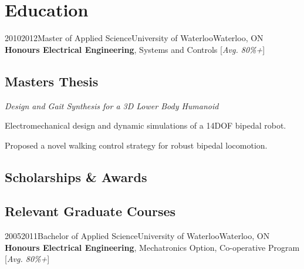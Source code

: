 \section{Education}

\vspace{2 mm}
\tlcventry
{2010}{2012}{Master of Applied Science}{University of Waterloo}{Waterloo, ON}{}
{\textbf{Honours Electrical Engineering}, Systems and Controls [\emph{Avg. 80\%+}]}

\subsection{Masters Thesis} %
	{\emph{Design and Gait Synthesis for a 3D Lower Body Humanoid}
	\begin{tightitemize}
		\item Electromechanical design and dynamic simulations of a 14DOF bipedal robot.
		\item Proposed a novel walking control strategy for robust bipedal locomotion.
	\end{tightitemize}}
	\vspace{-6 mm}
\subsection{Scholarships \& Awards} %
\subsection{Relevant Graduate Courses} %

\vspace{5 mm}
\tlcventry
{2005}{2011}{Bachelor of Applied Science}{University of Waterloo}{Waterloo, ON}{}
{\textbf{Honours Electrical Engineering}, Mechatronics Option, Co-operative Program
 [\emph{Avg. 80\%+}]}

